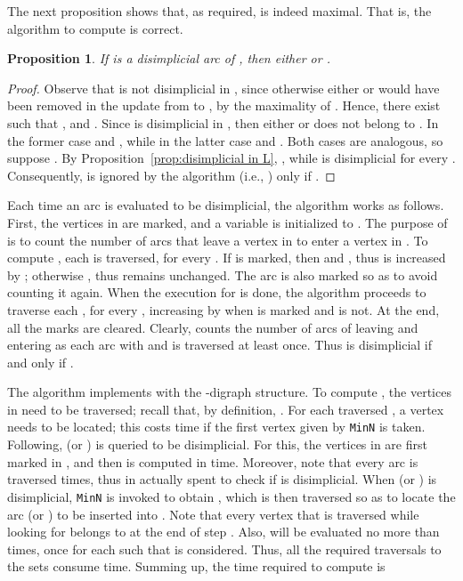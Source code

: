 \documentclass[a4paper,11pt]{article}
\newtheorem{proposition}[theorem]{Proposition}
\begin{document}
The next proposition shows that, as required,  is indeed maximal.  That is, the algorithm to compute  is correct. 

\begin{proposition}
 If  is a disimplicial arc of , then either  or .
\end{proposition}

\begin{proof}
  Observe that  is not disimplicial in , since otherwise either  or  would have been removed in the update from  to , by the maximality of .  Hence, there exist  such that ,  and .  Since  is disimplicial in , then either  or  does not belong to .  In the former case  and , while in the latter case  and .  Both cases are analogous, so suppose .  By Proposition~\ref{prop:disimplicial in L}, , while  is disimplicial for every .  Consequently,  is ignored by the algorithm (i.e., ) only if .
\end{proof}

Each time an arc  is evaluated to be disimplicial, the algorithm works as follows.  First, the vertices in  are marked, and a variable  is initialized to .  The purpose of  is to count the number of arcs that leave a vertex in  to enter a vertex in .  To compute , each  is traversed, for every . If  is marked, then  and , thus  is increased by ; otherwise , thus  remains unchanged.  The arc  is also marked so as to avoid counting it again.  When the execution for  is done, the algorithm proceeds to traverse each , for every , increasing  by  when  is marked and  is not.  At the end, all the marks are cleared.  Clearly,  counts the number of arcs of  leaving  and entering  as each arc  with  and  is traversed at least once.  Thus  is disimplicial if and only if .

The algorithm implements  with the -digraph structure.  To compute , the vertices in  need to be traversed; recall that, by definition, .  For each traversed , a vertex  needs to be located; this costs  time if the first vertex given by \texttt{MinN} is taken. Following,  (or ) is queried to be disimplicial.  For this, the vertices in  are first marked in , and then  is computed in  time.  Moreover, note that every arc is traversed  times, thus  in actually spent to check if  is disimplicial.  When  (or ) is disimplicial, \texttt{MinN} is invoked to obtain , which is then traversed so as to locate the arc  (or ) to be inserted into .  Note that every vertex  that is traversed while looking for  belongs to  at the end of step .  Also,  will be evaluated no more than  times, once for each  such that  is considered.  Thus, all the required traversals to the sets  consume  time. Summing up, the time required to compute  is
\end{document}
